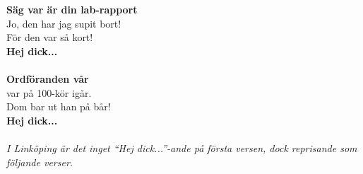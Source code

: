 \revrpt \textbf{Säg var är din lab-rapport}\\
Jo, den har jag supit bort!\rpt\\
För den var så kort!\\
\textbf{Hej dick...}\\
\\
\revrpt\textbf{Ordföranden vår}\\
var på 100-kör igår.\rpt\\
Dom bar ut han på bår!\\
\textbf{Hej dick...}\\
\\
{\footnotesize\textit{I Linköping är det inget ``Hej dick...''-ande på
    första versen, dock reprisande som följande verser.}}
